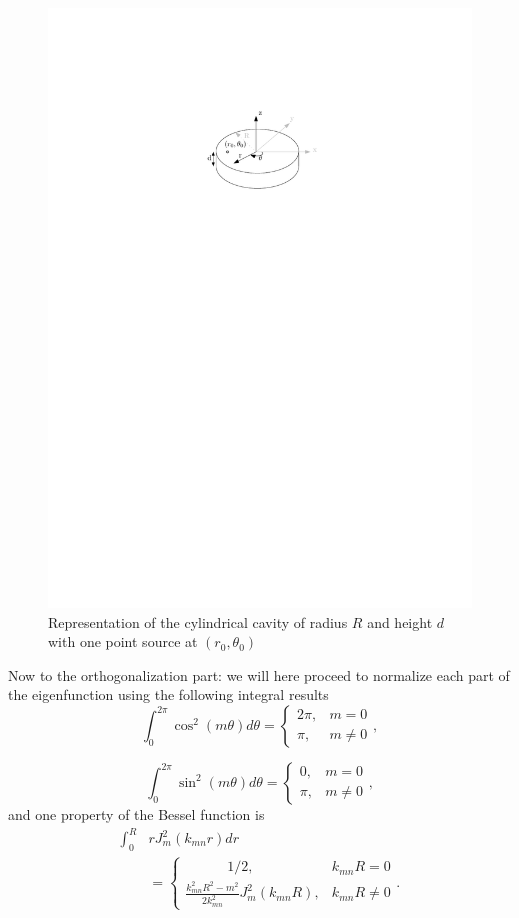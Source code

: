 \documentclass[%
 reprint,
 amsmath,amssymb,
 aip,
]{revtex4-1}
\begin{document}
\begin{figure}
    \centering
    \includegraphics[width=.35\textwidth]{figures/schema.pdf}
    \caption{Representation of the cylindrical cavity of radius $R$ and height $d$ with one point source at $(r_0, \theta_0)$}
    \label{fig:schema}
\end{figure}

Now to the orthogonalization part: we will here proceed to normalize each part of the eigenfunction using the following integral results
\begin{equation}
   \int_0^{2 \pi} \cos^2\left( m \theta \right) d\theta = 
    \begin{cases}    
        2 \pi, & m = 0\\
        \pi, & m \ne 0
    \end{cases}, \label{eq:dp_2}
\end{equation}

\begin{equation}
    \int_0^{2 \pi} \sin^2\left( m \theta \right) d\theta = 
    \begin{cases}    
        0, & m = 0\\
        \pi, & m \ne 0
    \end{cases}, \label{eq:dp_3}
\end{equation}
and one property of the Bessel function is
\begin{equation}
    \begin{split}
        \int_0^{R} &r J^2_m (k_{mn} r)dr \\ &=
    \begin{cases}    
        \quad  \quad \quad 1/2, & k_{mn}R = 0\\
        \frac{k^2_{mn} R^2 - m^2}{2 k^2_{mn}} J^2_m (k_{mn} R), & k_{mn}R \ne 0
    \end{cases}.
    \end{split} \label{eq:dp_4}
\end{equation}
\end{document}
